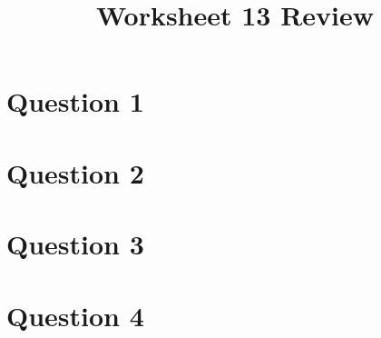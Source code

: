 \documentclass[12pt]{article}
\begin{document}
\title{Worksheet 13 Review}
\maketitle

\section*{Question 1}

\section*{Question 2}

\section*{Question 3}

\section*{Question 4}
\end{document}
